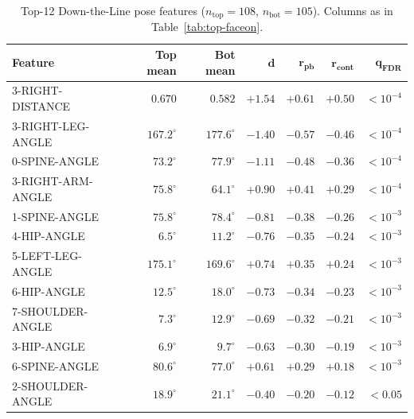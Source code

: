 \documentclass[11pt,a4paper]{article}
\begin{document}
\begin{table}[h]
\centering
\small
\caption{Top-12 Down-the-Line pose features ($n_\text{top}=108$, $n_\text{bot}=105$).  Columns as in
         Table~\ref{tab:top-faceon}.}
\label{tab:top-dtl}
\begin{tabular}{lrrrrrr}
\toprule
\textbf{Feature} & \textbf{Top mean} & \textbf{Bot mean} & $\boldsymbol{d}$ & $\boldsymbol{r_{\text{pb}}}$ & $\boldsymbol{r_{\text{cont}}}$ & $\boldsymbol{q_{\text{FDR}}}$ \\
\midrule
3-RIGHT-DISTANCE    & $0.670$         & $0.582$         & $+1.54$ & $+0.61$ & $+0.50$ & ${<}10^{-4}$ \\
3-RIGHT-LEG-ANGLE   & $167.2^{\circ}$ & $177.6^{\circ}$ & $-1.40$ & $-0.57$ & $-0.46$ & ${<}10^{-4}$ \\
0-SPINE-ANGLE       & $73.2^{\circ}$  & $77.9^{\circ}$  & $-1.11$ & $-0.48$ & $-0.36$ & ${<}10^{-4}$ \\
3-RIGHT-ARM-ANGLE   & $75.8^{\circ}$  & $64.1^{\circ}$  & $+0.90$ & $+0.41$ & $+0.29$ & ${<}10^{-4}$ \\
1-SPINE-ANGLE       & $75.8^{\circ}$  & $78.4^{\circ}$  & $-0.81$ & $-0.38$ & $-0.26$ & ${<}10^{-3}$ \\
4-HIP-ANGLE         & $6.5^{\circ}$   & $11.2^{\circ}$  & $-0.76$ & $-0.35$ & $-0.24$ & ${<}10^{-3}$ \\
5-LEFT-LEG-ANGLE    & $175.1^{\circ}$ & $169.6^{\circ}$ & $+0.74$ & $+0.35$ & $+0.24$ & ${<}10^{-3}$ \\
6-HIP-ANGLE         & $12.5^{\circ}$  & $18.0^{\circ}$  & $-0.73$ & $-0.34$ & $-0.23$ & ${<}10^{-3}$ \\
7-SHOULDER-ANGLE    & $7.3^{\circ}$   & $12.9^{\circ}$  & $-0.69$ & $-0.32$ & $-0.21$ & ${<}10^{-3}$ \\
3-HIP-ANGLE         & $6.9^{\circ}$   & $9.7^{\circ}$   & $-0.63$ & $-0.30$ & $-0.19$ & ${<}10^{-3}$ \\
6-SPINE-ANGLE       & $80.6^{\circ}$  & $77.0^{\circ}$  & $+0.61$ & $+0.29$ & $+0.18$ & ${<}10^{-3}$ \\
2-SHOULDER-ANGLE    & $18.9^{\circ}$  & $21.1^{\circ}$  & $-0.40$ & $-0.20$ & $-0.12$ & ${<}0.05$ \\
\bottomrule
\end{tabular}
\end{table}
\end{document}
